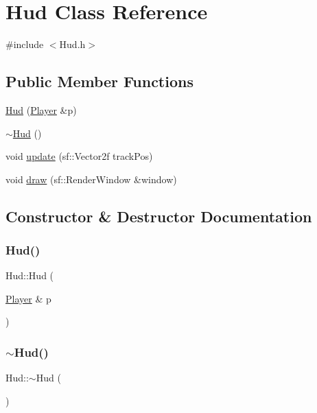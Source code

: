 \hypertarget{class_hud}{}\section{Hud Class Reference}
\label{class_hud}


{\ttfamily \#include $<$Hud.\+h$>$}

\subsection*{Public Member Functions}
\begin{DoxyCompactItemize}
\item 
\mbox{\hyperlink{class_hud_aa06ca28090a67dd9c96aa101802146b5}{Hud}} (\mbox{\hyperlink{class_player}{Player}} \&p)
\item 
\mbox{\hyperlink{class_hud_a2fbb662bbc70f646e081f9206a879b66}{$\sim$\+Hud}} ()
\item 
void \mbox{\hyperlink{class_hud_a536a4859da383379fbb8cecacb356314}{update}} (sf\+::\+Vector2f track\+Pos)
\item 
void \mbox{\hyperlink{class_hud_a1c1203c0ee146cef7b5075a4c6454d79}{draw}} (sf\+::\+Render\+Window \&window)
\end{DoxyCompactItemize}


\subsection{Constructor \& Destructor Documentation}
\mbox{\label{class_hud_aa06ca28090a67dd9c96aa101802146b5}} 
\subsubsection{\texorpdfstring{Hud()}{Hud()}}
{\footnotesize\ttfamily Hud\+::\+Hud (\begin{DoxyParamCaption}\item[{\mbox{\hyperlink{class_player}{Player}} \&}]{p }\end{DoxyParamCaption})}

\mbox{\label{class_hud_a2fbb662bbc70f646e081f9206a879b66}} 
\subsubsection{\texorpdfstring{$\sim$Hud()}{~Hud()}}
{\footnotesize\ttfamily Hud\+::$\sim$\+Hud (\begin{DoxyParamCaption}{ }\end{DoxyParamCaption})}




